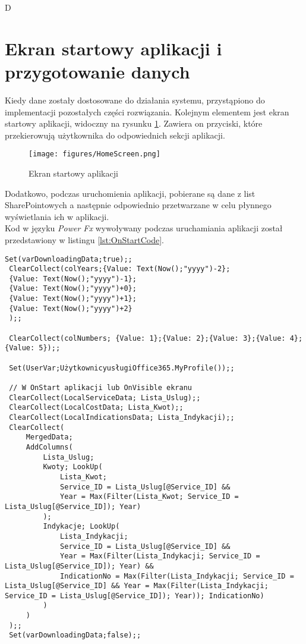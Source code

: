 D\section{Ekran startowy aplikacji i przygotowanie danych}
Kiedy dane zostały dostosowane do działania systemu, przystąpiono do implementacji pozostałych części rozwiązania.
Kolejnym elementem jest ekran startowy aplikacji, widoczny na rysunku \ref{fig:homescreen}. Zawiera on przyciski, które przekierowują użytkownika do odpowiednich sekcji aplikacji.

\begin{figure}[h]
    \centering
    \texttt{[image: figures/HomeScreen.png]}
    \caption{Ekran startowy aplikacji} 
    \label{fig:homescreen}
\end{figure}

Dodatkowo, podczas uruchomienia aplikacji, pobierane są dane z list SharePointowych a następnie odpowiednio przetwarzane w celu płynnego wyświetlania ich w aplikacji. \\
Kod w języku \emph{Power Fx} wywoływany podczas uruchamiania aplikacji został przedstawiony w listingu \ref{lst:OnStartCode}.

\begin{lstlisting}[language=PowerFx]
 Set(varDownloadingData;true);;
 ClearCollect(colYears;{Value: Text(Now();"yyyy")-2};
 {Value: Text(Now();"yyyy")-1};
 {Value: Text(Now();"yyyy")+0};
 {Value: Text(Now();"yyyy")+1};
 {Value: Text(Now();"yyyy")+2}
 );;
 
 ClearCollect(colNumbers; {Value: 1};{Value: 2};{Value: 3};{Value: 4};{Value: 5});;
 
 Set(UserVar;UżytkownicyusługiOffice365.MyProfile());;
 
 // W OnStart aplikacji lub OnVisible ekranu
 ClearCollect(LocalServiceData; Lista_Uslug);;
 ClearCollect(LocalCostData; Lista_Kwot);;
 ClearCollect(LocalIndicationsData; Lista_Indykacji);;
 ClearCollect(
     MergedData;
     AddColumns(
         Lista_Uslug;
         Kwoty; LookUp(
             Lista_Kwot;
             Service_ID = Lista_Uslug[@Service_ID] &&
             Year = Max(Filter(Lista_Kwot; Service_ID = Lista_Uslug[@Service_ID]); Year)
         );
         Indykacje; LookUp(
             Lista_Indykacji;
             Service_ID = Lista_Uslug[@Service_ID] &&
             Year = Max(Filter(Lista_Indykacji; Service_ID = Lista_Uslug[@Service_ID]); Year) &&
             IndicationNo = Max(Filter(Lista_Indykacji; Service_ID = Lista_Uslug[@Service_ID] && Year = Max(Filter(Lista_Indykacji; Service_ID = Lista_Uslug[@Service_ID]); Year)); IndicationNo)
         )
     )
 );;
 Set(varDownloadingData;false);;
 \end{lstlisting}

